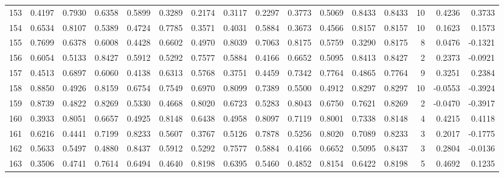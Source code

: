 \begin{tabular}{lrrrrrrrrrrrrrrr}
153 &      0.4197 &  0.7930 &  0.6358 &  0.5899 &  0.3289 &  0.2174 &  0.3117 &  0.2297 &  0.3773 &  0.5069 &   0.8433 &     0.8433 &     10 &                    0.4236 &                     0.3733 \\
154 &      0.6534 &  0.8107 &  0.5389 &  0.4724 &  0.7785 &  0.3571 &  0.4031 &  0.5884 &  0.3673 &  0.4566 &   0.8157 &     0.8157 &     10 &                    0.1623 &                     0.1573 \\
155 &      0.7699 &  0.6378 &  0.6008 &  0.4428 &  0.6602 &  0.4970 &  0.8039 &  0.7063 &  0.8175 &  0.5759 &   0.3290 &     0.8175 &      8 &                    0.0476 &                    -0.1321 \\
156 &      0.6054 &  0.5133 &  0.8427 &  0.5912 &  0.5292 &  0.7577 &  0.5884 &  0.4166 &  0.6652 &  0.5095 &   0.8413 &     0.8427 &      2 &                    0.2373 &                    -0.0921 \\
157 &      0.4513 &  0.6897 &  0.6060 &  0.4138 &  0.6313 &  0.5768 &  0.3751 &  0.4459 &  0.7342 &  0.7764 &   0.4865 &     0.7764 &      9 &                    0.3251 &                     0.2384 \\
158 &      0.8850 &  0.4926 &  0.8159 &  0.6754 &  0.7549 &  0.6970 &  0.8099 &  0.7389 &  0.5500 &  0.4912 &   0.8297 &     0.8297 &     10 &                   -0.0553 &                    -0.3924 \\
159 &      0.8739 &  0.4822 &  0.8269 &  0.5330 &  0.4668 &  0.8020 &  0.6723 &  0.5283 &  0.8043 &  0.6750 &   0.7621 &     0.8269 &      2 &                   -0.0470 &                    -0.3917 \\
160 &      0.3933 &  0.8051 &  0.6657 &  0.4925 &  0.8148 &  0.6438 &  0.4958 &  0.8097 &  0.7119 &  0.8001 &   0.7338 &     0.8148 &      4 &                    0.4215 &                     0.4118 \\
161 &      0.6216 &  0.4441 &  0.7199 &  0.8233 &  0.5607 &  0.3767 &  0.5126 &  0.7878 &  0.5256 &  0.8020 &   0.7089 &     0.8233 &      3 &                    0.2017 &                    -0.1775 \\
162 &      0.5633 &  0.5497 &  0.4880 &  0.8437 &  0.5912 &  0.5292 &  0.7577 &  0.5884 &  0.4166 &  0.6652 &   0.5095 &     0.8437 &      3 &                    0.2804 &                    -0.0136 \\
163 &      0.3506 &  0.4741 &  0.7614 &  0.6494 &  0.4640 &  0.8198 &  0.6395 &  0.5460 &  0.4852 &  0.8154 &   0.6422 &     0.8198 &      5 &                    0.4692 &                     0.1235 \\

\end{tabular}
